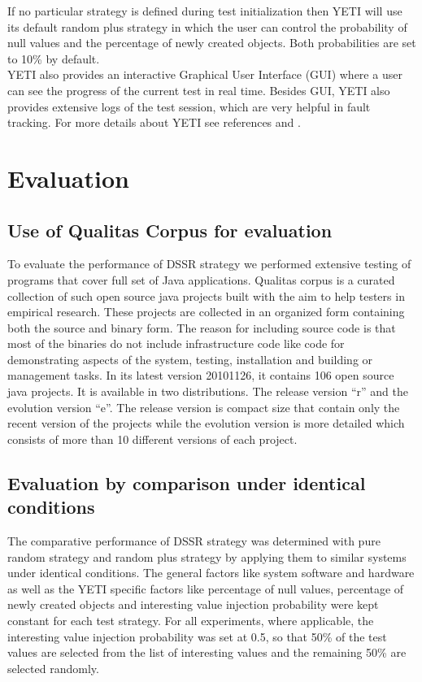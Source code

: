 \documentclass[conference]{IEEEtran}
\begin{document}
If no particular strategy is defined during test initialization then YETI will use its default random plus strategy in which the user can control the probability of null values and the percentage of newly created objects. Both probabilities are set to 10\% by default. \\
\indent YETI also provides an interactive Graphical User Interface (GUI) where a user can see the progress of the current test in real time. Besides GUI, YETI also provides extensive logs of the test session, which are very helpful in fault tracking. For more details about YETI see references \cite{Oriol2010a} and \cite{Oriol2010}.



\section{Evaluation}

\subsection{Use of Qualitas Corpus for evaluation}
To evaluate the performance of DSSR strategy we performed extensive testing of programs that cover full set of Java applications. Qualitas corpus \cite{Tempero2010a} is a curated collection of such open source java projects built with the aim to help testers in empirical research. These projects are collected in an organized form containing both the source and binary form. The reason for including source code is that most of the binaries do not include infrastructure code like code for demonstrating aspects of the system, testing, installation and building or management tasks. In its latest version 20101126, it contains 106 open source java projects. It is available in two distributions. The release version ``r'' and the evolution version ``e''. The release version is compact size that contain only the recent version of the projects while the evolution version is more detailed which consists of more than 10 different versions of each project.\\

\subsection{Evaluation by comparison under identical conditions}
The comparative performance of DSSR strategy was determined with pure random strategy and random plus strategy by applying them to similar systems under identical conditions. The general factors like system software and hardware as well as the YETI specific factors like percentage of null values, percentage of newly created objects and interesting value injection probability were kept constant for each test strategy. For all experiments, where applicable, the interesting value injection probability was set at 0.5, so that 50\% of the test values are selected from the list of interesting values and the remaining 50\% are selected randomly.\\
\end{document}
